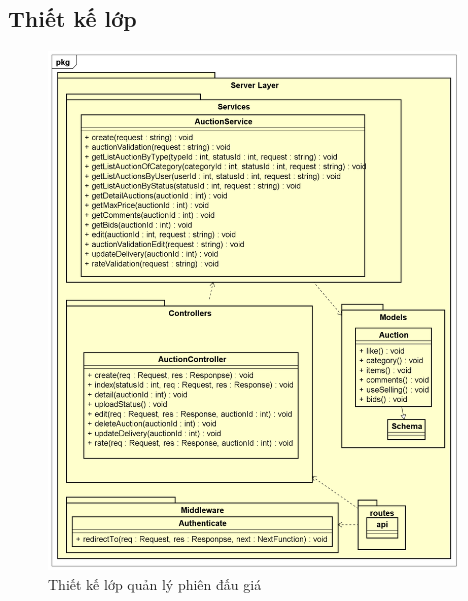\documentclass[../DoAn.tex]{subfiles}
\begin{document}
\subsection{Thiết kế lớp}
\begin{figure}[H]
    \centering
    \includegraphics[width=0.75\linewidth,height=13.74cm]{Hinhve/Thiết kế chi tiết75.png}
    \caption{Thiết kế lớp quản lý phiên đấu giá}%
    \label{fig:Fig412}
\end{figure}
\end{document}
